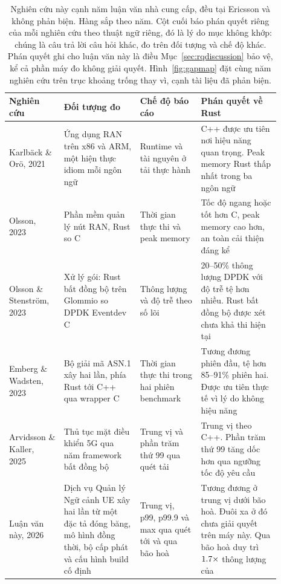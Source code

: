 \begin{table}[tp]
\centering
\small
\caption[Nghiên cứu này cạnh năm luận văn nhà cung cấp]{Nghiên cứu này cạnh năm luận văn nhà cung cấp, đều
tại Ericsson và không phản biện. Hàng sắp theo năm. Cột cuối
báo phán quyết riêng của mỗi nghiên cứu theo thuật ngữ riêng, đó là lý do mục không khớp: chúng
là câu trả lời câu hỏi khác, đo trên đối tượng và chế độ khác. Phán quyết ghi cho luận văn này là điều Mục~\ref{sec:rqdiscussion} bảo vệ, kể cả
phần máy đo không giải quyết. Hình~\ref{fig:gapmap} đặt cùng năm nghiên cứu trên
trục khoảng trống thay vì, cạnh tài liệu
đã phản biện.\label{tab:vendortheses}}
\renewcommand{\arraystretch}{1.2}
\begin{tabular}{@{}R{0.18\linewidth} R{0.25\linewidth} R{0.20\linewidth} R{0.26\linewidth}@{}}
\hline\hline
Nghiên cứu & Đối tượng đo & Chế độ báo cáo & Phán quyết về Rust \\
\hline
Karlb\"ack \& Or\"o, 2021~\cite{karlback2021ran} &
Ứng dụng RAN trên x86 và ARM, một hiện thực idiom mỗi ngôn ngữ &
Runtime và tài nguyên ở tải thực hành &
C++ được ưu tiên nơi hiệu năng quan trọng. Peak memory Rust thấp nhất trong ba
ngôn ngữ \\
Olsson, 2023~\cite{olsson2023ranmgmt} &
Phần mềm quản lý nút RAN, Rust so C &
Thời gian thực thi và peak memory &
Tốc độ ngang hoặc tốt hơn C, peak memory cao hơn, an toàn cải thiện đáng kể \\
Olsson \& Stenstr\"om, 2023~\cite{olsson2023asyncpackets} &
Xử lý gói: Rust bất đồng bộ trên Glommio so DPDK Eventdev C &
Thông lượng và độ trễ theo số lõi &
20--50\% thông lượng DPDK với độ trễ tệ hơn nhiều. Rust bất đồng bộ được xét chưa
khả thi hiện tại \\
Emberg \& Wadsten, 2023~\cite{emberg2023asn1} &
Bộ giải mã {ASN.1} xây hai lần, phía Rust tới C++ qua wrapper C &
Thời gian thực thi trong hai phiên benchmark &
Tương đương phiên đầu, tệ hơn 85--91\% phiên hai. Được ưu tiên thực tế vì
lý do không hiệu năng \\
Arvidsson \& Kaller, 2025~\cite{arvidsson2025async} &
Thủ tục mặt điều khiển 5G qua năm framework bất đồng bộ &
Trung vị và phần trăm thứ 99 qua quét tải &
Trung vị theo C++. Phần trăm thứ 99 tăng dốc hơn qua ngưỡng tốc độ yêu cầu \\
\hline
Luận văn này, 2026 &
Dịch vụ Quản lý Ngữ cảnh UE xây hai lần từ một đặc tả đóng băng, mô hình đồng thời,
bộ cấp phát và cấu hình build cố định &
Trung vị, p99, p99.9 và max qua quét tới và qua bão hoà &
Tương đương ở trung vị dưới bão hoà. Đuôi xa ở đó chưa giải quyết trên máy này. Qua
bão hoà \OverloadSustainedFaster{} duy trì $1.7\times$ thông lượng của
\OverloadSustainedSlower{} \\
\hline
\end{tabular}
\end{table}

